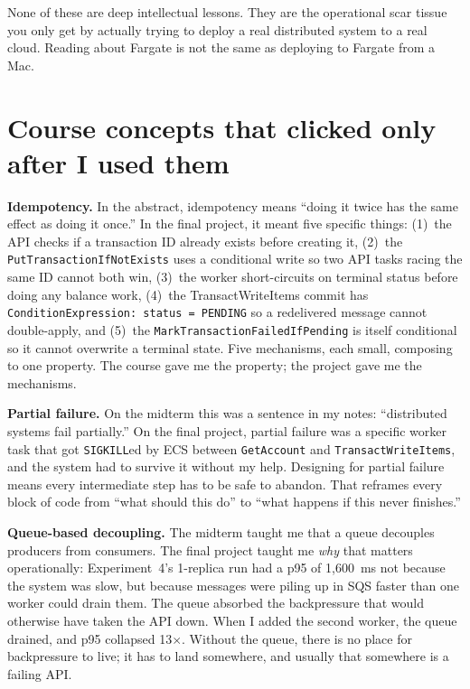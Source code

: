 \documentclass[11pt,a4paper]{article}
\begin{document}
None of these are deep intellectual lessons. They are the operational scar tissue you only get by actually trying to deploy a real distributed system to a real cloud. Reading about Fargate is not the same as deploying to Fargate from a Mac.

\section{Course concepts that clicked only after I used them}

\begin{conceptbox}
\textbf{Idempotency.} In the abstract, idempotency means ``doing it twice has the same effect as doing it once.'' In the final project, it meant five specific things: (1)~the API checks if a transaction ID already exists before creating it, (2)~the \texttt{PutTransactionIfNotExists} uses a conditional write so two API tasks racing the same ID cannot both win, (3)~the worker short-circuits on terminal status before doing any balance work, (4)~the TransactWriteItems commit has \texttt{ConditionExpression: status = PENDING} so a redelivered message cannot double-apply, and (5)~the \texttt{MarkTransactionFailedIfPending} is itself conditional so it cannot overwrite a terminal state. Five mechanisms, each small, composing to one property. The course gave me the property; the project gave me the mechanisms.
\end{conceptbox}

\begin{conceptbox}
\textbf{Partial failure.} On the midterm this was a sentence in my notes: ``distributed systems fail partially.'' On the final project, partial failure was a specific worker task that got \texttt{SIGKILL}ed by ECS between \texttt{GetAccount} and \texttt{TransactWriteItems}, and the system had to survive it without my help. Designing for partial failure means every intermediate step has to be safe to abandon. That reframes every block of code from ``what should this do'' to ``what happens if this never finishes.''
\end{conceptbox}

\begin{conceptbox}
\textbf{Queue-based decoupling.} The midterm taught me that a queue decouples producers from consumers. The final project taught me \textit{why} that matters operationally: Experiment~4's 1-replica run had a p95 of 1{,}600~ms not because the system was slow, but because messages were piling up in SQS faster than one worker could drain them. The queue absorbed the backpressure that would otherwise have taken the API down. When I added the second worker, the queue drained, and p95 collapsed 13$\times$. Without the queue, there is no place for backpressure to live; it has to land somewhere, and usually that somewhere is a failing API.
\end{conceptbox}
\end{document}
